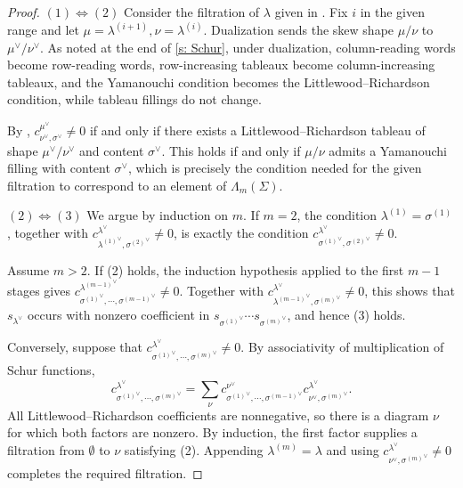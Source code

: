 \documentclass[11pt, reqno]{amsart}
\numberwithin{equation}{section}
\theoremstyle{definition}
\renewcommand{\l}{\lambda}
\newcommand{\s}{\sigma}
\begin{document}
\begin{proof}
$(1) \Leftrightarrow (2)$
Consider the filtration of $\l$ given in .
Fix $i$ in the given range and let $\mu=\l^{(i+1)}, \nu=\l^{(i)}$.
 Dualization sends the skew shape $\mu/\nu$ to $\mu^\vee/\nu^\vee$.
As noted at the end of  \cref{s: Schur}, under dualization, column-reading words become row-reading words, row-increasing tableaux become column-increasing tableaux, and the Yamanouchi condition becomes the Littlewood--Richardson condition, while tableau fillings do not change.

By  \cite[Proposition 3, p.~64]{FULTON_TABLEAUX}, $c^{\mu^\vee}_{\nu^\vee,\s^\vee}\neq 0$ if and only if there exists a Littlewood--Richardson tableau of shape $\mu^\vee/\nu^\vee$ and content $\sigma^\vee$. This holds if and only if $\mu/\nu$ admits a Yamanouchi filling with content $\s^\vee$, which is precisely the condition needed for the given filtration to correspond to an element of $\Lambda_m(\Sigma)$.

$(2) \Leftrightarrow (3)$
We argue by induction on $m$. If $m=2$, the condition $\lambda^{(1)}=\sigma^{(1)}$, together with $c^{\lambda^\vee}_{{\lambda^{(1)}}^\vee,{\sigma^{(2)}}^\vee}\neq0$, is exactly the condition $c^{\lambda^\vee}_{{\sigma^{(1)}}^\vee,{\sigma^{(2)}}^\vee}\neq0$.

Assume $m>2$. If (2) holds, the induction hypothesis applied to the first $m-1$ stages gives
$c^{{\lambda^{(m-1)}}^\vee}_{{\sigma^{(1)}}^\vee,\cdots,{\sigma^{(m-1)}}^\vee}\neq0$.
Together with $c^{\lambda^\vee}_{{\lambda^{(m-1)}}^\vee,{\sigma^{(m)}}^\vee}\neq0$, this shows that $s_{\lambda^\vee}$ occurs with nonzero coefficient in $s_{{\sigma^{(1)}}^\vee}\cdots s_{{\sigma^{(m)}}^\vee}$, and hence (3) holds.

Conversely, suppose that $c^{\lambda^\vee}_{{\sigma^{(1)}}^\vee,\cdots,{\sigma^{(m)}}^\vee}\neq0$. By associativity of multiplication of Schur functions,
\[
c^{\lambda^\vee}_{{\sigma^{(1)}}^\vee,\cdots,{\sigma^{(m)}}^\vee}
=\sum_{\nu}c^{\nu^\vee}_{{\sigma^{(1)}}^\vee,\cdots,{\sigma^{(m-1)}}^\vee}c^{\lambda^\vee}_{\nu^\vee,{\sigma^{(m)}}^\vee}.
\]
All Littlewood--Richardson coefficients are nonnegative, so there is a diagram $\nu$ for which both factors are nonzero. By induction, the first factor supplies a filtration from $\emptyset$ to $\nu$ satisfying (2). Appending $\lambda^{(m)}=\lambda$ and using $c^{\lambda^\vee}_{\nu^\vee,{\sigma^{(m)}}^\vee}\neq0$ completes the required filtration.
\end{proof}
\end{document}
